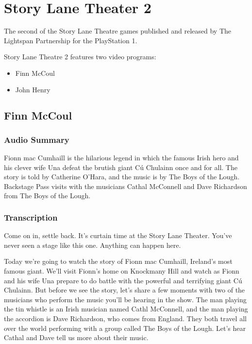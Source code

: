 \chapter{Story Lane Theater 2}


The second of the Story Lane Theatre games published and released by The Lightspan Partnership for the PlayStation 1.

Story Lane Theatre 2 features two video programs:

\begin{itemize}
    \item Finn McCoul
    \item John Henry
\end{itemize}

\clearpage
\newpage

\section{Finn McCoul}

\subsection{Audio Summary}

Fionn mac Cumhaill is the hilarious legend in which the famous Irish hero and his clever wife Una defeat the brutish giant Cú Chulainn once and for all. The story is told by Catherine O'Hara, and the music is by The Boys of the Lough. Backstage Pass visits with the musicians Cathal McConnell and Dave Richardson from The Boys of the Lough.

\subsection{Transcription}

Come on in, settle back. It's curtain time at the Story Lane Theater. You've never seen a stage like this one. Anything can happen here.

Today we're going to watch the story of Fionn mac Cumhaill, Ireland's most famous giant. We'll visit Fionn's home on Knockmany Hill and watch as Fionn and his wife Una prepare to do battle with the powerful and terrifying giant Cú Chulainn. But before we see the story, let's share a few moments with two of the musicians who perform the music you'll be hearing in the show. The man playing the tin whistle is an Irish musician named Cathl McConnell, and the man playing the accordion is Dave Richardson, who comes from England. They both travel all over the world performing with a group called The Boys of the Lough. Let's hear Cathal and Dave tell us more about their music.

